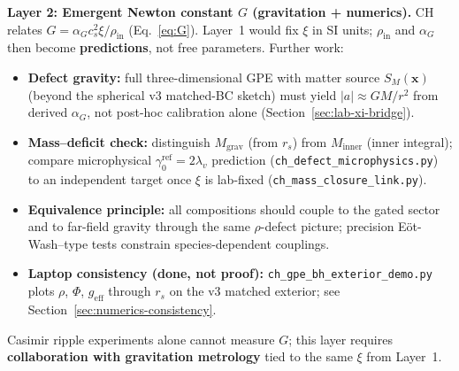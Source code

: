 \documentclass[11pt,a4paper]{article}
\begin{document}
\textbf{Layer 2: Emergent Newton constant $G$ (gravitation + numerics).}
CH relates $G = \alpha_G c_s^2 \xi / \rho_{\mathrm{in}}$ (Eq.~\ref{eq:G}).
Layer~1 would fix $\xi$ in SI units; $\rho_{\mathrm{in}}$ and $\alpha_G$ then become \textbf{predictions}, not free parameters.
Further work:
\begin{itemize}[leftmargin=*]
  \item \textbf{Defect gravity:} full three-dimensional GPE with matter source $S_M(\mathbf{x})$ (beyond the spherical v3 matched-BC sketch) must yield $|a| \approx GM/r^2$ from derived $\alpha_G$, not post-hoc calibration alone (Section~\ref{sec:lab-xi-bridge}).
  \item \textbf{Mass--deficit check:} distinguish $M_{\mathrm{grav}}$ (from $r_s$) from $M_{\mathrm{inner}}$ (inner integral); compare microphysical $\gamma_0^{\mathrm{ref}} = 2\lambda_v$ prediction (\texttt{ch\_defect\_microphysics.py}) to an independent target once $\xi$ is lab-fixed (\texttt{ch\_mass\_closure\_link.py}).
  \item \textbf{Equivalence principle:} all compositions should couple to the gated sector and to far-field gravity through the same $\rho$-defect picture; precision E\"ot-Wash--type tests constrain species-dependent couplings.
  \item \textbf{Laptop consistency (done, not proof):} \texttt{ch\_gpe\_bh\_exterior\_demo.py} plots $\rho$, $\Phi$, $g_{\mathrm{eff}}$ through $r_s$ on the v3 matched exterior; see Section~\ref{sec:numerics-consistency}.
\end{itemize}
Casimir ripple experiments alone cannot measure $G$; this layer requires \textbf{collaboration with gravitation metrology} tied to the same $\xi$ from Layer~1.
\end{document}
